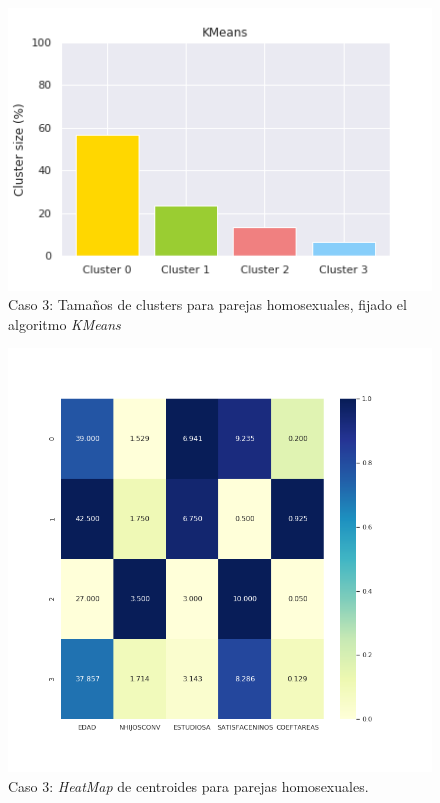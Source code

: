 \documentclass[11pt,a4paper]{article}
\begin{document}
	\begin{figure}[] 
		\centering
		\includegraphics[scale=0.6]{../Caso3/homo/clusters}
		\caption{Caso 3: Tamaños de clusters para parejas homosexuales, fijado el algoritmo \emph{KMeans}} 
		\label{clusters3homo}
	\end{figure}
	
	\begin{figure}[] 
		\centering
		\includegraphics[scale=0.6]{../Caso3/homo/heatmap}
		\caption{Caso 3: \emph{HeatMap} de centroides para parejas homosexuales.} 
		\label{heatmap3homo}
	\end{figure}
	
\end{document}
